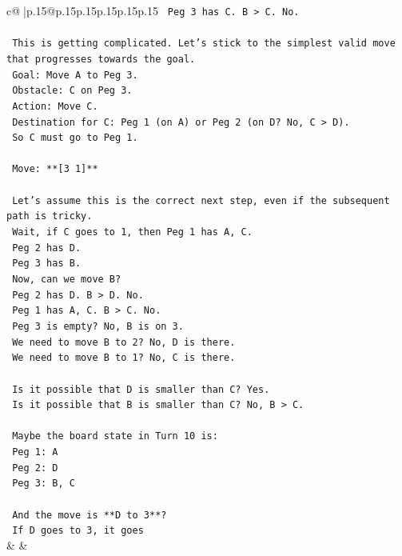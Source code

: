 \documentclass{article}
\begin{document}
{\begin{supertabular}{c@{$\;$}|p{.15\linewidth}@{}p{.15\linewidth}p{.15\linewidth}p{.15\linewidth}p{.15\linewidth}p{.15\linewidth}}
{{{\texttt{            Peg 3 has C. B > C. No.} \\
\\ 
\texttt{            This is getting complicated. Let's stick to the simplest valid move that progresses towards the goal.} \\
\texttt{            Goal: Move A to Peg 3.} \\
\texttt{            Obstacle: C on Peg 3.} \\
\texttt{            Action: Move C.} \\
\texttt{            Destination for C: Peg 1 (on A) or Peg 2 (on D? No, C > D).} \\
\texttt{            So C must go to Peg 1.} \\
\\ 
\texttt{            Move: **{[}3 1{]}**} \\
\\ 
\texttt{            Let's assume this is the correct next step, even if the subsequent path is tricky.} \\
\texttt{            Wait, if C goes to 1, then Peg 1 has A, C.} \\
\texttt{            Peg 2 has D.} \\
\texttt{            Peg 3 has B.} \\
\texttt{            Now, can we move B?} \\
\texttt{            Peg 2 has D. B > D. No.} \\
\texttt{            Peg 1 has A, C. B > C. No.} \\
\texttt{            Peg 3 is empty? No, B is on 3.} \\
\texttt{            We need to move B to 2? No, D is there.} \\
\texttt{            We need to move B to 1? No, C is there.} \\
\\ 
\texttt{            Is it possible that D is smaller than C? Yes.} \\
\texttt{            Is it possible that B is smaller than C? No, B > C.} \\
\\ 
\texttt{            Maybe the board state in Turn 10 is:} \\
\texttt{            Peg 1: A} \\
\texttt{            Peg 2: D} \\
\texttt{            Peg 3: B, C} \\
\\ 
\texttt{            And the move is **D to 3**?} \\
\texttt{            If D goes to 3, it goes} \\
            }
        }
    }
    & & \\ \\


\end{supertabular}}
\end{document}
